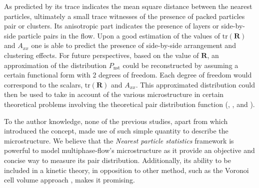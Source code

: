 \begin{enumerate}
    As predicted by \citet{zhang2023evolution} its trace indicates the mean square distance between the nearest particles, ultimately a small trace witnesses of the presence of packed particles pair or clusters.
    Its anisotropic part indicates the presence of layers or side-by-side particle pairs in the flow. %
Upon a good estimation of the values of $\text{tr}(\textbf{R})$ and $A_{xx}$ one is able to predict the presence of side-by-side arrangement and clustering effects. 
For future perspectives, based on the value of $\textbf{R}$, an approximation of the distribution $P_\text{nst}$ could be reconstructed by assuming a certain functional form with 2 degrees of freedom.
Each degree of freedom would correspond to the scalars, $\text{tr}(\textbf{R})$ and $A_{xx}$.
This approximated distribution could then be used to take in account of the various microstructure in certain theoretical problems involving the theoretical pair distribution function (\citet{batchelor1972sedimentation}, \citet{hinch1977averaged}, and \citet{zhang2021ensemble}).
\end{enumerate}
To the author knowledge, none of the previous studies, apart from \citet{zhang2023evolution} which introduced the concept, made use of such simple quantity to describe the microstructure. 
We believe that the \textit{Nearest particle statistics} framework is powerful to model multiphase-flow's microstructure as it provide an objective and concise way to measure its pair distribution. 
Additionally, its ability to be included in a kinetic theory, in opposition to other method,  such as the Voronoi cell volume approach \citep{senthil2005voronoi}, makes it promising. 






